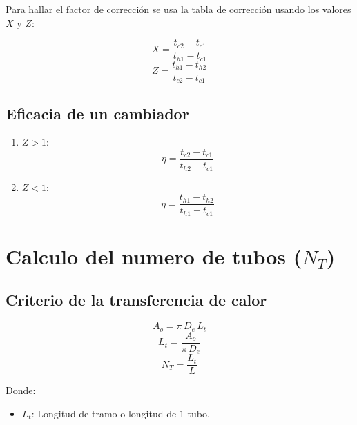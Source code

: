 Para hallar el factor de corrección se usa la tabla de corrección usando los
valores $X$ y $Z$:

\begin{equation}
    X = \frac{t_{c2} - t_{c1}}{t_{h1} - t_{c1}}
\end{equation}
\begin{equation}
    Z = \frac{t_{h1} - t_{h2}}{t_{c2} - t_{c1}}
\end{equation}

\subsection{Eficacia de un cambiador}

\begin{enumerate}
    \item $Z > 1$:
        \begin{equation}
            \eta = \frac{t_{c2} - t_{c1}}{t_{h2} - t_{c1}}
        \end{equation}
    \item $Z < 1$:
        \begin{equation}
            \eta = \frac{t_{h1} - t_{h2}}{t_{h1} - t_{c1}}
        \end{equation}
\end{enumerate}

\section{Calculo del numero de tubos ($N_T$)}

\subsection{Criterio de la transferencia de calor}

\begin{equation*}
    A_o = \pi\,D_e\,L_t
\end{equation*}
\begin{equation*}
    L_t = \frac{A_o}{\pi\,D_e}
\end{equation*}
\begin{equation*}
    N_T = \frac{L_t}{L}
\end{equation*}

Donde:
\begin{itemize}
    \item $L_t$: Longitud de tramo o longitud de $1$ tubo.
\end{itemize}


